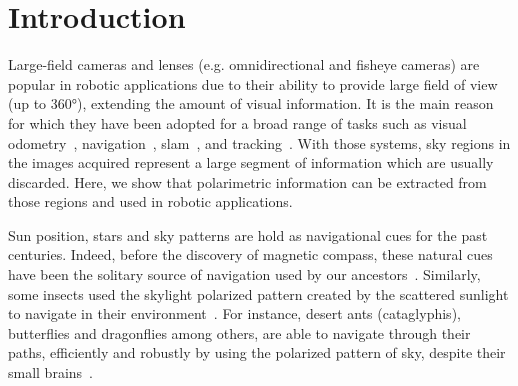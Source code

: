 \graphicspath{{./content/intro/figures/}}

\section{Introduction}
\label{sec:intro}

Large-field cameras and lenses (e.g. omnidirectional and fisheye cameras) are
popular in robotic applications due to their ability to provide large field of
view (up to \ang{360}), extending the amount of visual information. It is the
main reason for which they have been adopted for a broad range of tasks such as
visual odometry~\cite{scaramuzza2008appearance},
navigation~\cite{winters2000omni}, \gls{slam}~\cite{kim2003slam}, and
tracking~\cite{kobilarov2006people}. With those systems, sky regions in the
images acquired represent a large segment of information which are usually
discarded. Here, we show that polarimetric information can be extracted from
those regions and used in robotic applications.


Sun position, stars and sky patterns are hold as navigational cues for the past
centuries. Indeed, before the discovery of magnetic compass, these natural cues
have been the solitary source of navigation used by our
ancestors~\cite{barta2005psychophysical,horvath2011trail}. Similarly, some
insects used the skylight polarized pattern created by the scattered sunlight
to navigate in their
environment~\cite{wehner03antnavigation,labhart202odometer}. For instance,
desert ants (cataglyphis), butterflies and dragonflies among others, are able
to navigate through their paths, efficiently and robustly by using the
polarized pattern of sky, despite their small
brains~\cite{labhart202odometer,wehner03antnavigation,hamaoui2017polarized}.

